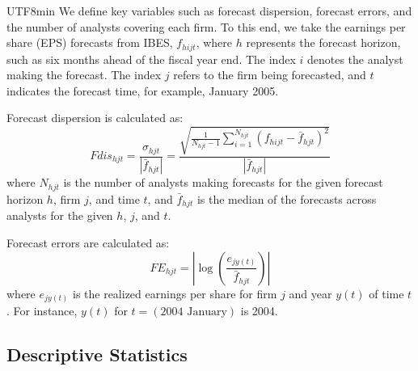 \documentclass[12pt, a4paper]{article}
\begin{document}
\begin{CJK}{UTF8}{min}
We define key variables such as forecast dispersion, forecast errors, and the number of analysts covering each firm. 
To this end, we take the earnings per share (EPS) forecasts from IBES, $f_{hijt}$, where $h$ represents the forecast horizon, such as six months ahead of the fiscal year end. 
The index $i$ denotes the analyst making the forecast. 
The index $j$ refers to the firm being forecasted, and $t$ indicates the forecast time, for example, January 2005.

Forecast dispersion is calculated as:
\begin{equation}
    Fdis_{hjt} = \frac{\sigma_{hjt}}{|\bar{f}_{hjt}|} = \frac{\sqrt{\frac{1}{N_{hjt}-1} \sum_{i=1}^{N_{hjt}} (f_{hijt} - \bar{f}_{hjt})^2}}{|\bar{f}_{hjt}|}
\end{equation}
where $N_{hjt}$ is the number of analysts making forecasts for the given forecast horizon $h$, firm $j$, and time $t$, and $\bar{f}_{hjt}$ is the median of the forecasts across analysts for the given $h$, $j$, and $t$.

Forecast errors are calculated as:
\begin{equation}
    FE_{hjt} = \left| \log \left( \frac{e_{jy(t)}}{\bar{f}_{hjt}} \right) \right|
\end{equation}
where $e_{jy(t)}$ is the realized earnings per share for firm $j$ and year $y(t)$ of time $t$. For instance, $y(t)$ for $t=(\text{2004 January})$ is 2004.



\subsection{Descriptive Statistics}

\begin{table}[htbp]
\centering
\resizebox{1.\textwidth}{!}{
\begin{threeparttable}

\begin{tablenotes}
\footnotesize
\item
\end{tablenotes}
\end{threeparttable}
}
\caption{Descriptive Statistics: Dataset A}
\label{tab:desc_stats_a}
\end{table}


\end{CJK}
\end{document}
